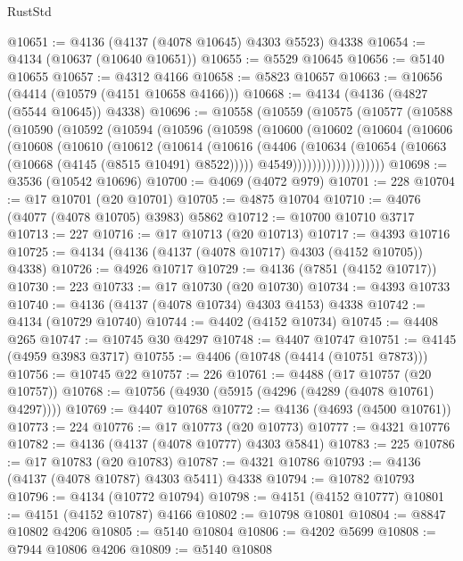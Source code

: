 \begin{lexlean}{RustStd}
\begin{coremodule}
{\begin{coremodule}
{{{{{{{{{{{{{{{{{{{{{{{{{{{{{{{{{{{{{{{{{{{{{{{{{{@10651 := @4136 (@4137 (@4078 @10645) @4303 @5523) @4338
@10654 := @4134 (@10637 (@10640 @10651))
@10655 := @5529 @10645
@10656 := @5140 @10655
@10657 := @4312 @4166
@10658 := @5823 @10657
@10663 := @10656 (@4414 (@10579 (@4151 @10658 @4166)))
@10668 := @4134 (@4136 (@4827 (@5544 @10645)) @4338)
@10696 := @10558
    (@10559
      (@10575
        (@10577
          (@10588
            (@10590
              (@10592
                (@10594
                  (@10596
                    (@10598
                      (@10600
                        (@10602
                          (@10604
                            (@10606
                              (@10608
                                (@10610
                                  (@10612
                                    (@10614
                                      (@10616
                                        (@4406
                                          (@10634
                                            (@10654 (@10663 (@10668 (@4145 (@8515 @10491) @8522)))))
                                          @4549)))))))))))))))))))
@10698 := @3536 (@10542 @10696)
@10700 := @4069 (@4072 @979)
@10701 := 228
@10704 := @17 @10701 (@20 @10701)
@10705 := @4875 @10704
@10710 := @4076 (@4077 (@4078 @10705) @3983) @5862
@10712 := @10700 @10710 @3717
@10713 := 227
@10716 := @17 @10713 (@20 @10713)
@10717 := @4393 @10716
@10725 := @4134 (@4136 (@4137 (@4078 @10717) @4303 (@4152 @10705)) @4338)
@10726 := @4926 @10717
@10729 := @4136 (@7851 (@4152 @10717))
@10730 := 223
@10733 := @17 @10730 (@20 @10730)
@10734 := @4393 @10733
@10740 := @4136 (@4137 (@4078 @10734) @4303 @4153) @4338
@10742 := @4134 (@10729 @10740)
@10744 := @4402 (@4152 @10734)
@10745 := @4408 @265
@10747 := @10745 @30 @4297
@10748 := @4407 @10747
@10751 := @4145 (@4959 @3983 @3717)
@10755 := @4406 (@10748 (@4414 (@10751 @7873)))
@10756 := @10745 @22
@10757 := 226
@10761 := @4488 (@17 @10757 (@20 @10757))
@10768 := @10756 (@4930 (@5915 (@4296 (@4289 (@4078 @10761) @4297))))
@10769 := @4407 @10768
@10772 := @4136 (@4693 (@4500 @10761))
@10773 := 224
@10776 := @17 @10773 (@20 @10773)
@10777 := @4321 @10776
@10782 := @4136 (@4137 (@4078 @10777) @4303 @5841)
@10783 := 225
@10786 := @17 @10783 (@20 @10783)
@10787 := @4321 @10786
@10793 := @4136 (@4137 (@4078 @10787) @4303 @5411) @4338
@10794 := @10782 @10793
@10796 := @4134 (@10772 @10794)
@10798 := @4151 (@4152 @10777)
@10801 := @4151 (@4152 @10787) @4166
@10802 := @10798 @10801
@10804 := @8847 @10802 @4206
@10805 := @5140 @10804
@10806 := @4202 @5699
@10808 := @7944 @10806 @4206
@10809 := @5140 @10808
}}}}}}}}}}}}}}}}}}}}}}}}}}}}}}}}}}}}}}}}}}}}}}}}}}
\end{coremodule}}
\end{coremodule}
\end{lexlean}
